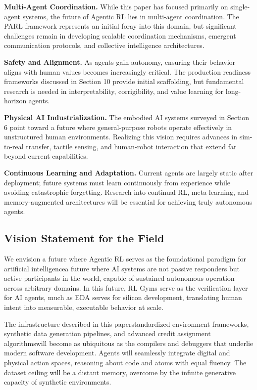 \textbf{Multi-Agent Coordination.} While this paper has focused primarily on single-agent systems, the future of Agentic RL lies in multi-agent coordination. The PARL framework represents an initial foray into this domain, but significant challenges remain in developing scalable coordination mechanisms, emergent communication protocols, and collective intelligence architectures.

\textbf{Safety and Alignment.} As agents gain autonomy, ensuring their behavior aligns with human values becomes increasingly critical. The production readiness frameworks discussed in Section 10 provide initial scaffolding, but fundamental research is needed in interpretability, corrigibility, and value learning for long-horizon agents.

\textbf{Physical AI Industrialization.} The embodied AI systems surveyed in Section 6 point toward a future where general-purpose robots operate effectively in unstructured human environments. Realizing this vision requires advances in sim-to-real transfer, tactile sensing, and human-robot interaction that extend far beyond current capabilities.

\textbf{Continuous Learning and Adaptation.} Current agents are largely static after deployment; future systems must learn continuously from experience while avoiding catastrophic forgetting. Research into continual RL, meta-learning, and memory-augmented architectures will be essential for achieving truly autonomous agents.

\subsection{Vision Statement for the Field}

We envision a future where Agentic RL serves as the foundational paradigm for artificial intelligencea future where AI systems are not passive responders but active participants in the world, capable of sustained autonomous operation across arbitrary domains. In this future, RL Gyms serve as the verification layer for AI agents, much as EDA serves for silicon development, translating human intent into measurable, executable behavior at scale.

The infrastructure described in this paperstandardized environment frameworks, synthetic data generation pipelines, and advanced credit assignment algorithmswill become as ubiquitous as the compilers and debuggers that underlie modern software development. Agents will seamlessly integrate digital and physical action spaces, reasoning about code and atoms with equal fluency. The dataset ceiling will be a distant memory, overcome by the infinite generative capacity of synthetic environments.

